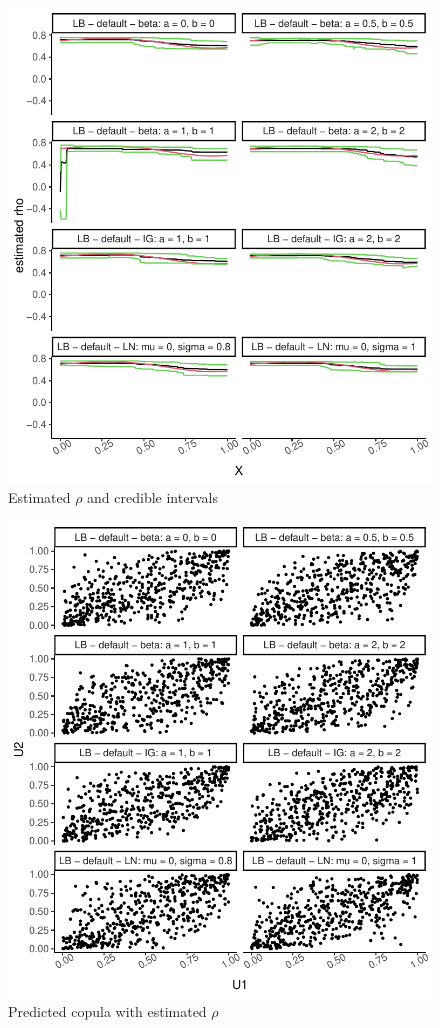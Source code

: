 \documentclass{amsart}
\begin{document}
\fi
\begin{figure}[ht]
	\centering
	\includegraphics[width=0.95\linewidth]{predicted_rho_5.pdf}
	\caption{Estimated $\rho$ and credible intervals}
	\label{fig:pred:rho:5}
\end{figure}

\begin{figure}[ht]
	\centering
	\includegraphics[width=0.95\linewidth]{simulated_copula_5.pdf}
	\caption{Predicted copula with estimated $\rho$}
	\label{fig:sim:copula:5}
\end{figure}
\end{document}
